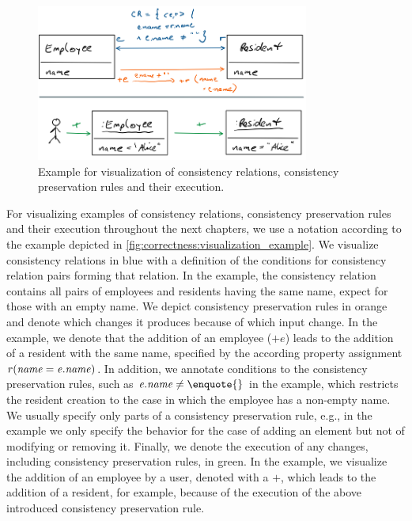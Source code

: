 \begin{figure}
    \centering
    \includegraphics[width=0.8\textwidth]{figures/correctness/notion/visualization_example.png}
    \caption[Example for concept visualizations]{Example for visualization of consistency relations, consistency preservation rules and their execution.}
    \label{fig:correctness:visualization_example}
\end{figure}

For visualizing examples of consistency relations, consistency preservation rules and their execution throughout the next chapters, we use a notation according to the example depicted in \autoref{fig:correctness:visualization_example}.
We visualize consistency relations in blue with a definition of the conditions for consistency relation pairs forming that relation.
In the example, the consistency relation contains all pairs of employees and residents having the same name, expect for those with an empty name.
We depict consistency preservation rules in orange and denote which changes it produces because of which input change.
In the example, we denote that the addition of an employee ($+e$) leads to the addition of a resident with the same name, specified by the according property assignment $r(\mathit{name} = \mathit{e.name})$.
In addition, we annotate conditions to the consistency preservation rules, such as $\mathvariable{e.name} \neq \textnormal{\enquote{}}$ in the example, which restricts the resident creation to the case in which the employee has a non-empty name.
We usually specify only parts of a consistency preservation rule, e.g., in the example we only specify the behavior for the case of adding an element but not of modifying or removing it.
Finally, we denote the execution of any changes, including consistency preservation rules, in green.
In the example, we visualize the addition of an employee by a user, denoted with a $+$, which leads to the addition of a resident, for example, because of the execution of the above introduced consistency preservation rule.


